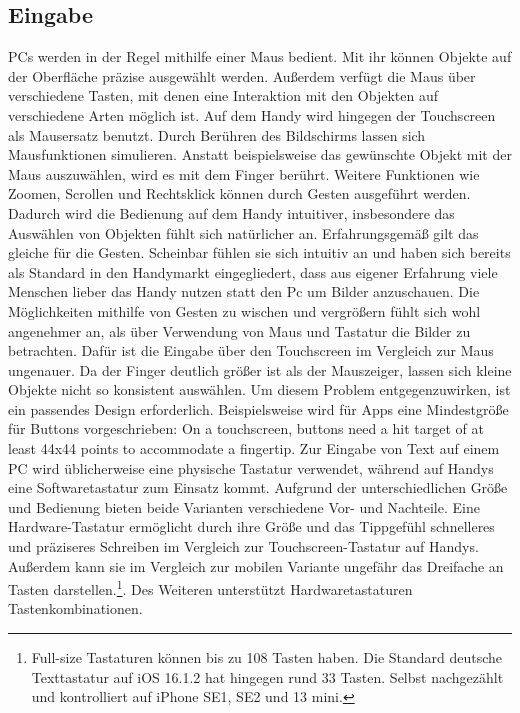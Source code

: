 \subsection{Eingabe} 
PCs werden in der Regel mithilfe einer Maus bedient. Mit ihr können Objekte auf der Oberfläche präzise ausgewählt werden. Außerdem verfügt die Maus über verschiedene Tasten, mit denen eine Interaktion mit den Objekten auf verschiedene Arten möglich ist.\newline%
Auf dem Handy wird hingegen der Touchscreen als Mausersatz benutzt. Durch Berühren des Bildschirms lassen sich Mausfunktionen simulieren. Anstatt beispielsweise das gewünschte Objekt mit der Maus auszuwählen, wird es mit dem Finger berührt. Weitere Funktionen wie Zoomen, Scrollen und Rechtsklick können durch Gesten ausgeführt werden.\newline%
	Dadurch wird die Bedienung auf dem Handy intuitiver, insbesondere das Auswählen von Objekten fühlt sich natürlicher an.\newline%
		Erfahrungsgemäß gilt das gleiche für die Gesten. Scheinbar fühlen sie sich intuitiv an und haben sich bereits als Standard in den Handymarkt eingegliedert, dass aus eigener Erfahrung viele Menschen lieber das Handy nutzen statt den Pc um Bilder anzuschauen. Die Möglichkeiten mithilfe von Gesten zu wischen und vergrößern fühlt sich wohl angenehmer an, als über Verwendung von Maus und Tastatur die Bilder zu betrachten.\newline%
	Dafür ist die Eingabe über den Touchscreen im Vergleich zur Maus ungenauer. Da der Finger deutlich größer ist als der Mauszeiger, lassen sich kleine Objekte nicht so konsistent auswählen. Um diesem Problem entgegenzuwirken, ist ein passendes Design erforderlich. Beispielsweise wird für Apps eine Mindestgröße für Buttons vorgeschrieben: \glqq On a touchscreen, buttons need a hit target of at least 44x44 points to accommodate a fingertip\grqq{}\cite{konventionen_buttonSize}.%
\myNewSection%
Zur Eingabe von Text auf einem PC wird üblicherweise eine physische Tastatur verwendet, während auf Handys eine Softwaretastatur zum Einsatz kommt. Aufgrund der unterschiedlichen Größe und Bedienung bieten beide Varianten verschiedene Vor- und Nachteile.\newline%
	Eine Hardware-Tastatur ermöglicht durch ihre Größe und das Tippgefühl schnelleres und präziseres Schreiben im Vergleich zur Touchscreen-Tastatur auf Handys. Außerdem kann sie im Vergleich zur mobilen Variante ungefähr das Dreifache an Tasten darstellen.\footnote{Full-size Tastaturen können bis zu 108 Tasten haben\cite{pcVsphone_pcKeyboardSize}. Die Standard deutsche Texttastatur auf iOS 16.1.2 hat hingegen rund 33 Tasten. Selbst nachgezählt und kontrolliert auf iPhone SE1, SE2 und 13 mini.}. Des Weiteren unterstützt Hardwaretastaturen Tastenkombinationen. %
